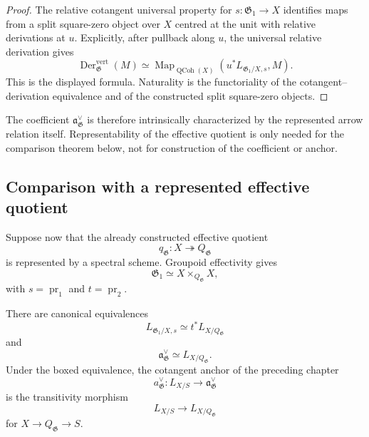 \begin{proof}
The relative cotangent universal property for
$s:\mathfrak G_1\to X$ identifies maps from a split square-zero object over
$X$ centred at the unit with relative derivations at $u$.  Explicitly, after
pullback along $u$, the universal relative derivation gives
\[
    \operatorname{Der}^{\mathrm{vert}}_{\mathfrak G}(M)
    \simeq
    \operatorname{Map}_{\operatorname{QCoh}(X)}
    \left(
        u^*L_{\mathfrak G_1/X,s},M
    \right).
\]
This is the displayed formula.  Naturality is the functoriality of the
cotangent--derivation equivalence and of the constructed split square-zero
objects.
\end{proof}

\begin{remark}
The coefficient $\mathfrak a^\vee_{\mathfrak G}$ is therefore intrinsically
characterized by the represented arrow relation itself.  Representability of
the effective quotient is only needed for the comparison theorem below, not
for construction of the coefficient or anchor.
\end{remark}

\subsection{Comparison with a represented effective quotient}

Suppose now that the already constructed effective quotient
\[
    q_{\mathfrak G}:X\twoheadrightarrow Q_{\mathfrak G}
\]
is represented by a spectral scheme.  Groupoid effectivity gives
\[
    \mathfrak G_1
    \simeq
    X\times_{Q_{\mathfrak G}}X,
\]
with $s=\operatorname{pr}_1$ and $t=\operatorname{pr}_2$.

\begin{theorem}
\label{thm:bnla-relative-cotangent-identification}
There are canonical equivalences
\[
    L_{\mathfrak G_1/X,s}
    \simeq
    t^*L_{X/Q_{\mathfrak G}}
\]
and
\[
    \boxed{
    \mathfrak a^\vee_{\mathfrak G}
    \simeq
    L_{X/Q_{\mathfrak G}}.}
\]
Under the boxed equivalence, the cotangent anchor of the preceding chapter
\[
    a^\vee_{\mathfrak G}:
    L_{X/S}\longrightarrow\mathfrak a^\vee_{\mathfrak G}
\]
is the transitivity morphism
\[
    L_{X/S}\longrightarrow L_{X/Q_{\mathfrak G}}
\]
for $X\to Q_{\mathfrak G}\to S$.
\end{theorem}

